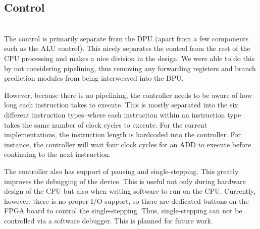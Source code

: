 \documentclass[lettersize,journal]{IEEEtran}
\begin{document}
\subsection{Control}
\color{red}{Incomplete...}\color{black}\\
The control is primarily separate from the DPU (apart from a few components such as the ALU control).
This nicely separates the control from the rest of the CPU processing and makes a nice division in the design.
We were able to do this by not considering pipelining, thus removing any forwarding registers and branch prediction modules from being interweaved into the DPU.

However, because there is no pipelining, the controller needs to be aware of how long each instruction takes to execute.
This is mostly separated into the six different instruction types--where each instruciton within an instruction type takes the same number of clock cycles to execute.
For the current implementations, the instruction length is hardcoded into the controller. For instance, the controller will wait four clock cycles for an ADD to execute
before continuing to the next instruction.

The controller also has support of pausing and single-stepping.
This greatly improves the debugging of the device.
This is useful not only during hardware design of the CPU but also when writing software to run on the CPU.
Currently, however, there is no proper I/O support, so there are dedicated buttons on the FPGA board to control the single-stepping.
Thus, single-stepping can not be controlled via a software debugger.
This is planned for future work.
\end{document}
